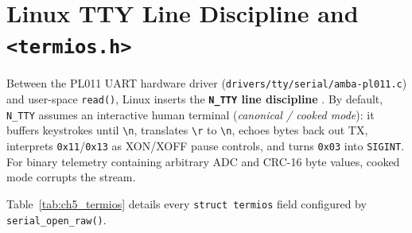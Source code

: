 \documentclass[11pt,a4paper,oneside]{report}
\begin{document}
\section{Linux TTY Line Discipline and \texttt{<termios.h>}}

Between the PL011 UART hardware driver (\texttt{drivers/tty/serial/amba-pl011.c}) and user-space \texttt{read()}, Linux inserts the \textbf{\texttt{N\_TTY} line discipline} \cite{man_termios}. By default, \texttt{N\_TTY} assumes an interactive human terminal (\emph{canonical / cooked mode}): it buffers keystrokes until \texttt{\textbackslash n}, translates \texttt{\textbackslash r} to \texttt{\textbackslash n}, echoes bytes back out TX, interprets \texttt{0x11}/\texttt{0x13} as XON/XOFF pause controls, and turns \texttt{0x03} into \texttt{SIGINT}. For binary telemetry containing arbitrary ADC and CRC-16 byte values, cooked mode corrupts the stream.

Table~\ref{tab:ch5_termios} details every \texttt{struct termios} field configured by \texttt{serial\_open\_raw()}.
\end{document}
